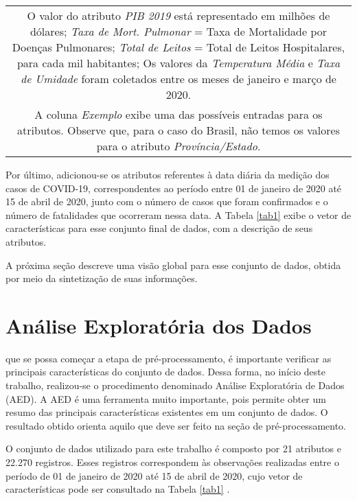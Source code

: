 \documentclass{ieeeaccess}
\begin{document}
\begin{table}[t!]
\begin{tabular}{| c | l | l | l | l |}
		\multicolumn{5}{p{235pt}}{O valor do atributo \textit{PIB 2019} está representado em milhões de dólares; \textit{Taxa de Mort. Pulmonar} = Taxa de Mortalidade por Doenças Pulmonares; \textit{Total de Leitos} = Total de Leitos Hospitalares, para cada mil habitantes; Os valores da \textit{Temperatura Média} e \textit{Taxa de Umidade} foram coletados entre os meses de janeiro e março de 2020.}\\
		
		\multicolumn{5}{p{235pt}}{A coluna \textit{Exemplo} exibe uma das possíveis entradas para os atributos. Observe que, para o caso do Brasil, não temos os valores para o atributo \textit{Província/Estado}.}\\	
		
	\end{tabular}
\end{table}


Por último, adicionou-se os atributos referentes à data diária da medição dos casos de COVID-19, correspondentes ao período entre 01 de janeiro de 2020 até 15 de abril de 2020, junto com o número de casos que foram confirmados e o número de fatalidades que ocorreram nessa data. A Tabela \ref{tab1} exibe o vetor de características para esse conjunto final de dados, com a descrição de seus atributos.

A próxima seção descreve uma visão global para esse conjunto de dados, obtida por meio da sintetização de suas informações.

\section{Análise Exploratória dos Dados}

\label{sec:introduction}  que se possa começar a etapa de pré-processamento, é importante verificar as principais características do conjunto de dados. Dessa forma, no início deste trabalho, realizou-se o procedimento denominado Análise Exploratória de Dados (AED). A AED é uma ferramenta muito importante, pois permite obter um resumo das principais características existentes em um conjunto de dados. O resultado obtido orienta aquilo que deve ser feito na seção de pré-processamento.

O conjunto de dados utilizado para este trabalho é composto por 21 atributos e 22.270 registros. Esses registros correspondem às observações realizadas entre o período de 01 de janeiro de 2020 até 15 de abril de 2020, cujo vetor de características pode ser consultado na Tabela \ref{tab1} . 
\end{document}
